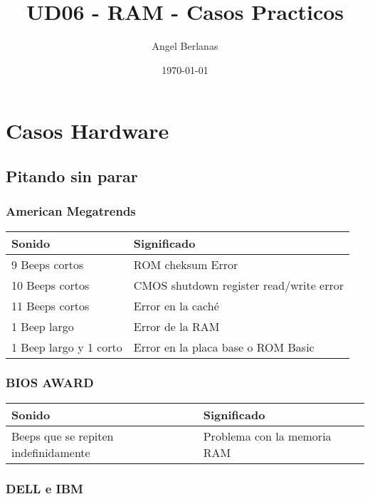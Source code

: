 \documentclass[11pt]{article}
\author{Angel Berlanas}
\date{\today}
\title{UD06 - RAM - Casos Practicos}
\begin{document}
\maketitle
\tableofcontents


\section{Casos Hardware}
\label{sec:orgdcbd6cc}

\subsection{Pitando sin parar}
\label{sec:orgb413ef2}

\subsubsection{American Megatrends}
\label{sec:org89a2f12}

\begin{center}
\begin{tabular}{ll}
Sonido & Significado\\
\hline
9 Beeps cortos & ROM cheksum Error\\
10 Beeps cortos & CMOS shutdown register read/write error\\
11 Beeps cortos & Error en la caché\\
1 Beep largo & Error de la RAM\\
1 Beep largo y 1 corto & Error en la placa base o ROM Basic\\
\end{tabular}
\end{center}

\subsubsection{BIOS AWARD}
\label{sec:orgb321a35}

\begin{center}
\begin{tabular}{ll}
Sonido & Significado\\
\hline
Beeps que se repiten indefinidamente & Problema con la memoria RAM\\
\end{tabular}
\end{center}


\subsubsection{DELL e IBM}
\label{sec:orgbb7e946}
\end{document}
